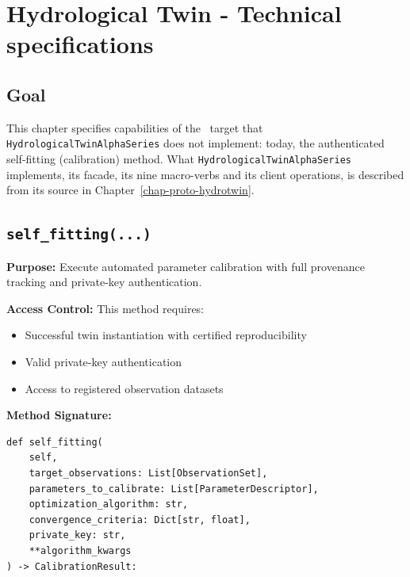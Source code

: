 \chapter{Hydrological Twin - Technical specifications} \label{chap-tech-surf}

\fancyhead[LE]{\thepage} 
\fancyhead[RO]{\thepage} 
\renewcommand{\headrulewidth}{1pt}

\setlength{\parindent}{0cm} %
\setlength{\parskip}{9pt}

\htastarget


\section{Goal}

This chapter specifies capabilities of the \hydrot\ target that
\texttt{HydrologicalTwinAlphaSeries} does not implement: today, the
authenticated self-fitting (calibration) method. What
\texttt{HydrologicalTwinAlphaSeries} implements, its facade, its nine
macro-verbs and its client operations, is described from its source in
Chapter~\ref{chap-proto-hydrotwin}.

\section{\texttt{self\_fitting(...)}}

\textbf{Purpose:}  
Execute automated parameter calibration with full provenance tracking and private-key authentication.

\textbf{Access Control:}  
This method requires:
\begin{itemize}
    \item Successful twin instantiation with certified reproducibility
    \item Valid private-key authentication
    \item Access to registered observation datasets
\end{itemize}

\textbf{Method Signature:}

\begin{verbatim}
def self_fitting(
    self,
    target_observations: List[ObservationSet],
    parameters_to_calibrate: List[ParameterDescriptor],
    optimization_algorithm: str,
    convergence_criteria: Dict[str, float],
    private_key: str,
    **algorithm_kwargs
) -> CalibrationResult:
\end{verbatim}


